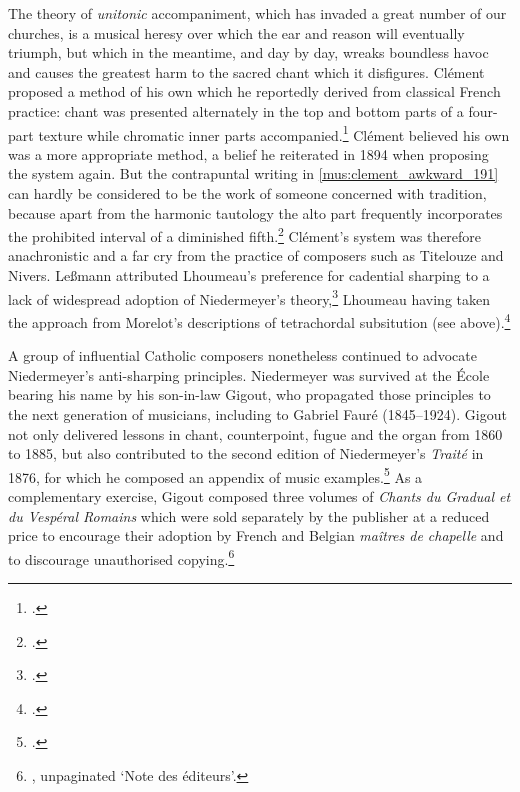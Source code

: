   {\cite[360]{ClementMethodecompleteplainchant1872}}
{The theory of \emph{unitonic} accompaniment, which has invaded a great number of our churches, is a musical heresy over which the ear and reason will eventually triumph, but which in the meantime, and day by day, wreaks boundless havoc and causes the greatest harm to the sacred chant which it disfigures.}
%
\noindent
Clément proposed a method of his own which he reportedly derived from classical French practice: chant was presented alternately in the top and bottom parts of a four-part texture while chromatic inner parts accompanied.\footcite[191, 194]{ClementAccompagnementplainchant1873}
Clément believed his own was a more appropriate method, a belief he reiterated in 1894 when proposing the system again.
But the contrapuntal writing in \cref{mus:clement_awkward_191} can hardly be considered to be the work of someone concerned with tradition, because apart from the harmonic tautology the alto part frequently incorporates the prohibited interval of a diminished fifth.\footcite[191]{ClementMethodeorgueaccompagnement1894}
Clément's system was therefore anachronistic and a far cry from the practice of composers such as Titelouze and Nivers.
%
Leßmann attributed Lhoumeau's preference for cadential sharping to a lack of widespread adoption of Niedermeyer's theory,\footcite[220]{LessmannRezeptiongregorianischenChorals2016} Lhoumeau having taken the approach from Morelot's descriptions of tetrachordal subsitution (see  above).\footcite[4, 8, 14, 16--17]{Lhoumeaualterationoudemiton1879}

A group of influential Catholic composers nonetheless continued to advocate Niedermeyer's anti-sharping principles.
Niedermeyer was survived at the École bearing his name by his son-in-law Gigout, who propagated those principles to the next generation of \mbox{musicians}, including to Gabriel Fauré (1845--1924).
Gigout not only delivered lessons in chant, counterpoint, fugue and the organ from 1860 to 1885, but also contributed to the second edition of Niedermeyer's \emph{Traité} in 1876, for which he composed an appendix of music examples.\footcite[p.~134 n.~1; Leßmann notes Gigout contributed to the second edition of Niedermeyer's text, referring quite correctly to the `Nouvelle' edition of 1876 and not the `2è tirage' of 1859 which was little more than a re-print of the first edition]{LessmannAllTheseRhythms2008}
As a complementary exercise, Gigout composed three volumes of \emph{Chants du Gradual et du Vespéral Romains} which were sold separately by the publisher at a reduced price to encourage their adoption by French and Belgian \emph{maîtres de chapelle} and to discourage unauthorised copying.\footnote{\cite{GigoutPartiepratique1876}, unpaginated `Note des éditeurs'.}

